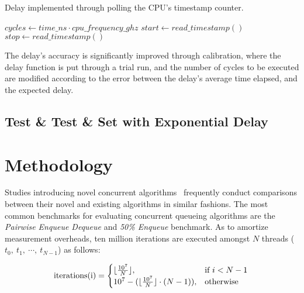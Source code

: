 \begin{algorithm}
    \caption{Delay implemented through polling the CPU's timestamp counter.}\label{alg:delay}
    \begin{algorithmic}[1]
            \State $cycles \gets time\_ns \cdot cpu\_frequency\_ghz$
            \State $start \gets read\_timestamp()$
            \Repeat
                \State $stop \gets read\_timestamp()$
        \EndFunction
    \end{algorithmic}
\end{algorithm}

The delay's accuracy is significantly improved through calibration, where the
delay function is put through a trial run, and the number of cycles to be
executed are modified according to the error between the delay's average time
elapsed, and the expected delay.

\subsection{Test \& Test \& Set with Exponential Delay}


\section{Methodology}

Studies introducing novel concurrent
algorithms~\citep{michael1996simple,valois1994queues,kogan2011wait,hoffman2007baskets,yang2016wait}
frequently conduct comparisons between their novel and existing algorithms in
similar fashions. The most common benchmarks for evaluating concurrent queueing
algorithms are the \emph{Pairwise Enqueue Dequeue} and \emph{50\% Enqueue}
benchmark. As to amortize measurement overheads, ten million iterations are
executed amongst $N$ threads ($t_0,~t_1,~\cdots,~t_{N-1}$) as follows: 

\[
    \text{iterations(i)} = 
    \begin{cases}
        \lfloor\frac{10^7}{N}\rfloor, & \text{if}~i < N-1 \\
        10^7 - (\lfloor \frac{10^7}{N} \rfloor \cdot (N-1)), & \text{otherwise}
    \end{cases} \\
\]

